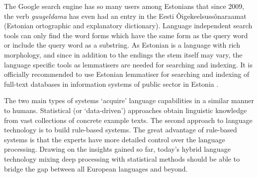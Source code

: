 \documentclass[]{../metanetpaper}
\begin{document}
\begin{multicols}{2}
The Google search engine has so many users among Estonians that since 2009, the verb \textit{guugeldama} has even had an entry in the Eesti Õigekeelsussõnaraamat (Estonian ortographic and explanatory dictionary).
Language independent search tools can only find the word forms which have the same form as the query word or include the query word as a substring. 
As Estonian is a language with rich morphology, and since in addition to the endings the stem itself may vary, the language specific tools as lemmatisers are needed for searching and indexing. 
It is officially recommended to use Estonian lemmatiser for searching and indexing of full-text databases in information systems of public sector in Estonia \cite{RIA}.

The two main types of systems ‘acquire’ language capabilities in a similar manner to humans. Statistical (or ‘data-driven’) approaches obtain linguistic knowledge from vast collections of concrete example texts. 
The second approach to language technology is to build rule-based systems. The great advantage of rule-based systems is that the experts have more detailed control over the language processing.  
Drawing on the insights gained so far, today’s hybrid language technology mixing deep processing with statistical methods should be able to bridge the gap between all European languages and beyond. 



\end{multicols}
\end{document}
